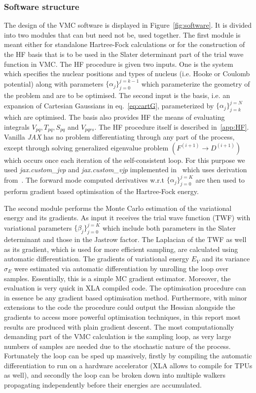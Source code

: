 \documentclass[final,3p,times,twocolumn]{elsarticle}
\begin{document}
	\subsubsection{Software structure}
	The design of the VMC software is displayed in Figure~\ref{fig:software}. It is divided into two modules that can but need not be, used together. The first module is meant either for standalone Hartree-Fock calculations or for the construction of the HF basis that is to be used in the Slater determinant part of the trial wave function in VMC. The HF procedure is given two inputs. One is the system which specifies the nuclear positions and types of nucleus (i.e. Hooke or Coulomb potential) along with parameters $\{\alpha_{j}\}_{j=0}^{j=k-1}$ which parameterize the geometry of the problem and are to be optimised. The second input is the basis, i.e. an expansion of Cartesian Gaussians in eq.~\eqref{eq:cartG}, parameterized by $\{\alpha_{j}\}_{j=k}^{j=N}$ which are optimised. The basis also provides HF the means of evaluating integrals $V_{p q}, T_{p q}, S_{p q}$ and $V_{pqrs}$. The HF procedure itself is described in~\ref{app:HF}. Vanilla \emph{JAX} has no problem differentiating through any part of the process, except through solving  generalized eigenvalue problem $(F^{(i+1)} \rightarrow D^{(i+1)})$ which occurs once each iteration of the self-consistent loop. For this purpose we used \emph{jax.custom\_jvp} and \emph{jax.custom\_vjp} implemented in~\cite{dj2021gep} which uses derivation from~\cite{boeddeker2017computation}. The forward mode computed derivatives w.r.t $\{\alpha_{j}\}_{j=0}^{j=K}$ are then used to perform gradient based optimisation of the Hartree-Fock energy.
		
	The second module performs the Monte Carlo estimation of the variational energy and its gradients. As input it receives the trial wave function (TWF) with variational parameters $\{\beta_{j}\}_{j=0}^{j=K}$ which include both parameters in the Slater determinant and those in the Jastrow factor. The Laplacian of the TWF as well as its gradient, which is used for more efficient sampling, are calculated using automatic differentiation. 
	The gradients of variational energy $E_V$ and its variance $\sigma_{E}$ were estimated via automatic differentiation by unrolling the loop over samples. Essentially, this is a simple MC gradient estimator. Moreover, the evaluation is very quick in XLA compiled code. The optimisation procedure can in essence be any gradient based optimisation method. Furthermore, with minor extensions to the code the procedure could output the Hessian alongside the gradients to access more powerful optimisation techniques, in this report most results are produced with plain gradient descent. The most computationally demanding part of the VMC calculation is the sampling loop, as very large numbers of samples are needed due to the stochastic nature of the process. Fortunately the loop can be sped up massively, firstly by compiling the automatic differentiation to run on a hardware accelerator (XLA allows to compile for TPUs as well), and secondly the loop can be broken down into multiple walkers propagating independently before their energies are accumulated.
	
\end{document}
